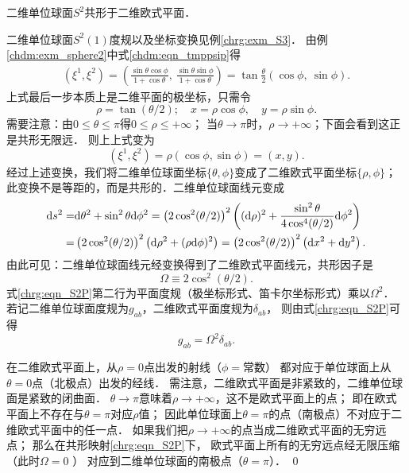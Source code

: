 \begin{example}
	二维单位球面$S^2$共形于二维欧式平面．
\end{example}
二维单位球面$S^2(1)$度规以及坐标变换见例\ref{chrg:exm_S3}．
由例\ref{chdm:exm_sphere2}中式\eqref{chdm:eqn_tmppsip}得
\begin{align}
	(\xi^1,\xi^2) 
	= \left(\frac{\sin\theta \cos\phi }{1+\cos\theta},\ \frac{\sin\theta \sin\phi}{1+\cos\theta}\right) 
	= \tan \frac{\theta}{2} \left(\cos\phi,\ \sin\phi\right).
\end{align}
上式最后一步本质上是二维平面的极坐标，只需令
\begin{equation}
	\rho=\tan ({\theta}/{2});\quad 
	x = \rho \cos\phi, \quad y = \rho \sin\phi .
\end{equation}
需要注意：由$0 \leqslant \theta \leqslant \pi$得$0\leqslant \rho \leqslant +\infty$；
当$\theta\to \pi$时，$\rho\to +\infty$；下面会看到这正是共形无限远．
则上上式变为
\begin{equation}
	(\xi^1,\xi^2)=\rho\left(\cos\phi,\sin\phi\right) = (x,y).
\end{equation}
经过上述变换，我们将二维单位球面坐标$\{\theta,\phi\}$变成了二维欧式平面坐标$\{\rho,\phi\}$；
此变换不是等距的，而是共形的．二维单位球面线元变成
\begin{align}
	\mathrm{d} {s}^2 =& \mathrm{d} \theta^2+\sin ^2 \theta \mathrm{d} \phi^2 
	= \left(2 \cos^2(\theta / 2) \right)^2 \left( (\mathrm{d} \rho)^2+ 
	\frac{\sin ^2 \theta }{4 \cos^4(\theta / 2)} \mathrm{d} \phi^2 \right)\notag \\
	=& \left(2 \cos^2(\theta / 2) \right)^2 \left( \mathrm{d} \rho^2+ (\rho \mathrm{d} \phi)^2 \right)
	= \left(2 \cos^2(\theta / 2) \right)^2 \left( \mathrm{d} x^2 + \mathrm{d} y^2 \right).
	\label{chrg:eqn_S2P}
\end{align}
由此可见：二维单位球面线元经变换得到了二维欧式平面线元，共形因子是
\begin{equation}
	\Omega \equiv 2 \cos ^2(\theta / 2) .
\end{equation}
式\eqref{chrg:eqn_S2P}第二行为平面度规（极坐标形式、笛卡尔坐标形式）乘以$\Omega^2$．
若记二维单位球面度规为$g_{ab}$，二维欧式平面度规为$\delta_{ab}$，
则由式\eqref{chrg:eqn_S2P}可得
\begin{equation}
	g_{ab} = \Omega^2 \delta_{ab} .
\end{equation}

在二维欧式平面上，从$\rho=0$点出发的射线（$\phi=$常数）
都对应于单位球面上从$\theta=0$点（北极点）出发的经线．
需注意，二维欧式平面是非紧致的，二维单位球面是紧致的闭曲面．
$\theta \rightarrow \pi$意味着$\rho \rightarrow +\infty$，这不是欧式平面上的点；
即在欧式平面上不存在与$\theta=\pi$对应$\rho$值；
因此单位球面上$\theta=\pi$的点（南极点）不对应于二维欧式平面中的任一点．
如果我们把$\rho \rightarrow +\infty$的点当成二维欧式平面的无穷远点；
那么在共形映射\eqref{chrg:eqn_S2P}下，
欧式平面上所有的无穷远点经无限压缩（此时$\Omega=0$ ）
对应到二维单位球面的南极点（$\theta=\pi$）．
\qed


